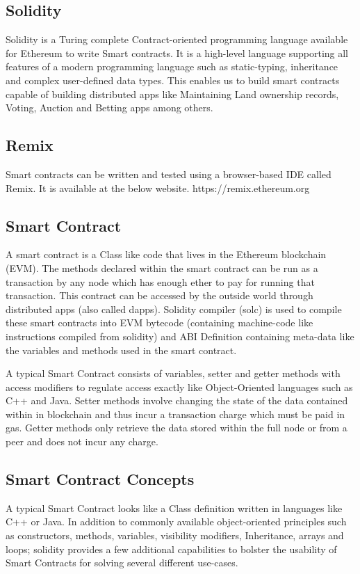 \documentclass[11pt,openright]{report}
\begin{document}
\subsection{Solidity}
Solidity is a Turing complete Contract-oriented programming language available for Ethereum to write Smart contracts. It is a high-level language supporting all features of a modern programming language such as static-typing, inheritance and complex user-defined data types. This enables us to build smart contracts capable of building distributed apps like Maintaining Land ownership records, Voting, Auction and Betting apps among others.

\subsection{Remix}
Smart contracts can be written and tested using a browser-based IDE called Remix. It is available at the below website.
https://remix.ethereum.org

\subsection{Smart Contract}
A smart contract is a Class like code that lives in the Ethereum blockchain (EVM). The methods declared within the smart contract can be run as a transaction by any node which has enough ether to pay for running that transaction. This contract can be accessed by the outside world through distributed apps (also called dapps). Solidity compiler (solc) is used to compile these smart contracts into EVM bytecode (containing machine-code like instructions compiled from solidity) and ABI Definition containing meta-data like the variables and methods used in the smart contract.

A typical Smart Contract consists of variables, setter and getter methods with access modifiers to regulate access exactly like Object-Oriented languages such as C++ and Java. Setter methods involve changing the state of the data contained within in blockchain and thus incur a transaction charge which must be paid in gas. Getter methods only retrieve the data stored within the full node or from a peer and does not incur any charge.

\subsection{Smart Contract Concepts}
A typical Smart Contract looks like a Class definition written in languages like C++ or Java. In addition to commonly available object-oriented principles such as constructors, methods, variables, visibility modifiers, Inheritance, arrays and loops; solidity provides a few additional capabilities to bolster the usability of Smart Contracts for solving several different use-cases.
\end{document}

